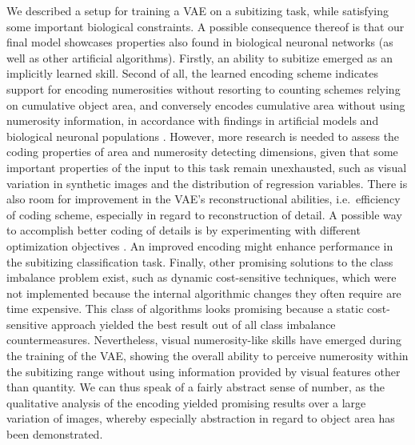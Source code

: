 \documentclass[twocolumn]{article}
\begin{document}
We described a setup for training a VAE on a subitizing task, while
satisfying some important biological constraints. A possible consequence
thereof is that our final model showcases properties also found in
biological neuronal networks (as well as other artificial algorithms).
Firstly, an ability to subitize emerged as an implicitly learned skill.
Second of all, the learned encoding scheme indicates support for
encoding numerosities without resorting to counting schemes relying on
cumulative object area, and conversely encodes cumulative area
without using numerosity information, in accordance with findings in artificial models \citep{stoianov2012} and biological neuronal populations \citep{harvey2013topographic, nieder2016neuronal}. However,
more research is needed to assess the coding properties of area and numerosity detecting dimensions, given that some important properties of the input to this task remain unexhausted, such as visual variation in synthetic images and the distribution of regression variables.
There is also room for improvement in the VAE's reconstructional abilities,
i.e.~efficiency of coding scheme, especially in regard to reconstruction of detail. A possible way to accomplish better coding of details is by experimenting with different optimization objectives \citep[e.g.][]{dosovitskiy2016generating}. An improved encoding might enhance performance in the subitizing classification task. Finally, other promising solutions to the class imbalance problem exist, such as dynamic cost-sensitive techniques, which were not implemented because the internal algorithmic changes they often require are time expensive. This class of algorithms looks promising because a static cost-sensitive approach yielded the best result out of all class imbalance countermeasures. 
Nevertheless, visual numerosity-like skills have emerged during the
training of the VAE, showing the overall ability to perceive numerosity
within the subitizing range without using information provided by visual
features other than quantity. We can thus speak of a fairly abstract
sense of number, as the qualitative analysis of the encoding yielded
promising results over a large variation of images, whereby especially
abstraction in regard to object area has been demonstrated.


\end{document}
